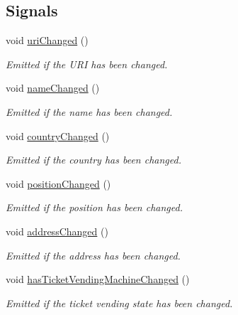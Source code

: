 \subsection*{Signals}
\begin{DoxyCompactItemize}
\item 
void \mbox{\hyperlink{classQRail_1_1StationEngine_1_1Station_a25743385c35feaac93b667a9a828bde8}{uri\+Changed}} ()
\begin{DoxyCompactList}\small\item\em Emitted if the U\+RI has been changed. \end{DoxyCompactList}\item 
void \mbox{\hyperlink{classQRail_1_1StationEngine_1_1Station_ae25f24fcd0b5dd0e531b6f706ecddbb0}{name\+Changed}} ()
\begin{DoxyCompactList}\small\item\em Emitted if the name has been changed. \end{DoxyCompactList}\item 
void \mbox{\hyperlink{classQRail_1_1StationEngine_1_1Station_af78e11d187083959e6868d4590a2587b}{country\+Changed}} ()
\begin{DoxyCompactList}\small\item\em Emitted if the country has been changed. \end{DoxyCompactList}\item 
void \mbox{\hyperlink{classQRail_1_1StationEngine_1_1Station_a2cf29fceb09c32f8463c241c89bc4740}{position\+Changed}} ()
\begin{DoxyCompactList}\small\item\em Emitted if the position has been changed. \end{DoxyCompactList}\item 
void \mbox{\hyperlink{classQRail_1_1StationEngine_1_1Station_a2b3b24ebf7459ae4d7857b89dc8c6e7c}{address\+Changed}} ()
\begin{DoxyCompactList}\small\item\em Emitted if the address has been changed. \end{DoxyCompactList}\item 
void \mbox{\hyperlink{classQRail_1_1StationEngine_1_1Station_ad258fe381fab9d10634c79ef0c436f2e}{has\+Ticket\+Vending\+Machine\+Changed}} ()
\begin{DoxyCompactList}\small\item\em Emitted if the ticket vending state has been changed. \end{DoxyCompactList}\item 

\end{DoxyCompactItemize}
